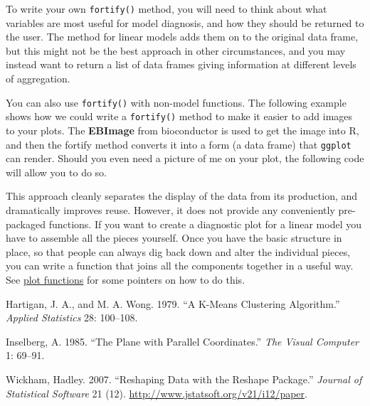 To write your own \texttt{fortify()} method, you will need to think
about what variables are most useful for model diagnosis, and how they
should be returned to the user. The method for linear models adds them
on to the original data frame, but this might not be the best approach
in other circumstances, and you may instead want to return a list of
data frames giving information at different levels of aggregation.

You can also use \texttt{fortify()} with non-model functions. The
following example shows how we could write a \texttt{fortify()} method
to make it easier to add images to your plots. The \textbf{EBImage} from
bioconductor is used to get the image into R, and then the fortify
method converts it into a form (a data frame) that \texttt{ggplot} can
render. Should you even need a picture of me on your plot, the following
code will allow you to do so. 

\begin{Shaded}
\begin{Highlighting}[]
\NormalTok{(}\NormalTok{)}
\StringTok{ }\NormalTok{()}
\NormalTok{(}
\StringTok{ }
\StringTok{ }\NormalTok{)}
\NormalTok{(}\NormalTok{:}\NormalTok{, }\NormalTok{:}\NormalTok{, } \NormalTok{) +}\StringTok{ }
\StringTok{  }
\end{Highlighting}
\end{Shaded}

This approach cleanly separates the display of the data from its
production, and dramatically improves reuse. However, it does not
provide any conveniently pre-packaged functions. If you want to create a
diagnostic plot for a linear model you have to assemble all the pieces
yourself. Once you have the basic structure in place, so that people can
always dig back down and alter the individual pieces, you can write a
function that joins all the components together in a useful way. See
\hyperref[sec:functions]{plot functions} for some pointers on how to do
this.

Hartigan, J. A., and M. A. Wong. 1979. ``A K-Means Clustering
Algorithm.'' \emph{Applied Statistics} 28: 100--108.

Inselberg, A. 1985. ``The Plane with Parallel Coordinates.'' \emph{The
Visual Computer} 1: 69--91.

Wickham, Hadley. 2007. ``Reshaping Data with the Reshape Package.''
\emph{Journal of Statistical Software} 21 (12).
\url{http://www.jstatsoft.org/v21/i12/paper}.
